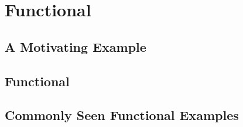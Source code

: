 \chapter{Functional}

\section{A Motivating Example}

\section{Functional}

\section{Commonly Seen Functional Examples}

